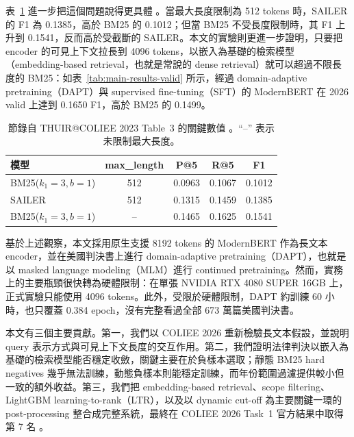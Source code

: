 表~\ref{tab:thuir-table3-excerpt} 進一步把這個問題說得更具體 \cite{li2023thuir}。當最大長度限制為 512 tokens 時，SAILER 的 F1 為 0.1385，高於 BM25 的 0.1012；但當 BM25 不受長度限制時，其 F1 上升到 0.1541，反而高於受截斷的 SAILER。本文的實驗則更進一步證明，只要把 encoder 的可見上下文拉長到 4096 tokens，以嵌入為基礎的檢索模型（embedding-based retrieval，也就是常說的 dense retrieval）就可以超過不限長度的 BM25：如表~\ref{tab:main-results-valid} 所示，經過 domain-adaptive pretraining（DAPT）與 supervised fine-tuning（SFT）的 ModernBERT 在 2026 valid 上達到 0.1650 F1，高於 BM25 的 0.1499。

\begin{table}[t]
  \centering
  \small
  \begin{tabular}{lcccc}
    \toprule
    模型 & max\_length & P@5 & R@5 & F1 \\
    \midrule
    BM25($k_1=3,b=1$) & 512 & 0.0963 & 0.1067 & 0.1012 \\
    SAILER & 512 & 0.1315 & 0.1459 & 0.1385 \\
    BM25($k_1=3,b=1$) & -- & 0.1465 & 0.1625 & 0.1541 \\
    \bottomrule
  \end{tabular}
  \caption{節錄自 THUIR@COLIEE 2023 Table~3 的關鍵數值 \cite{li2023thuir}。``--'' 表示未限制最大長度。}
  \label{tab:thuir-table3-excerpt}
\end{table}

基於上述觀察，本文採用原生支援 8192 tokens 的 ModernBERT \cite{warner2024modernbert} 作為長文本 encoder，並在美國判決書上進行 domain-adaptive pretraining（DAPT），也就是以 masked language modeling（MLM）進行 continued pretraining。然而，實務上的主要瓶頸很快轉為硬體限制：在單張 NVIDIA RTX 4080 SUPER 16GB 上，正式實驗只能使用 4096 tokens。此外，受限於硬體限制，DAPT 約訓練 60 小時，也只覆蓋 0.384 epoch，沒有完整看過全部 673 萬篇美國判決書。

本文有三個主要貢獻。第一，我們以 COLIEE 2026 重新檢驗長文本假設，並說明 query 表示方式與可見上下文長度的交互作用。第二，我們證明法律判決以嵌入為基礎的檢索模型能否穩定收斂，關鍵主要在於負樣本選取；靜態 BM25 hard negatives 幾乎無法訓練，動態負樣本則能穩定訓練，而年份範圍過濾提供較小但一致的額外收益。第三，我們把 embedding-based retrieval、scope filtering、LightGBM learning-to-rank（LTR），以及以 dynamic cut-off 為主要關鍵一環的 post-processing 整合成完整系統，最終在 COLIEE 2026 Task~1 官方結果中取得第 7 名 \cite{coliee2026task1results}。
